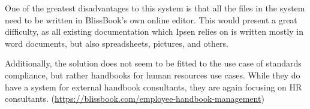One of the greatest disadvantages to this system is that all the files in the system need to be written in BlissBook's own online editor.
This would present a great difficulty, as all existing documentation which Ipsen relies on is written mostly in word documents, but also spreadsheets, pictures, and others.

Additionally, the solution does not seem to be fitted to the use case of standards compliance, but rather handbooks for human resources use cases.
While they do have a system for external handbook consultants, they are again focusing on HR consultants. (\url{https://blissbook.com/employee-handbook-management})
